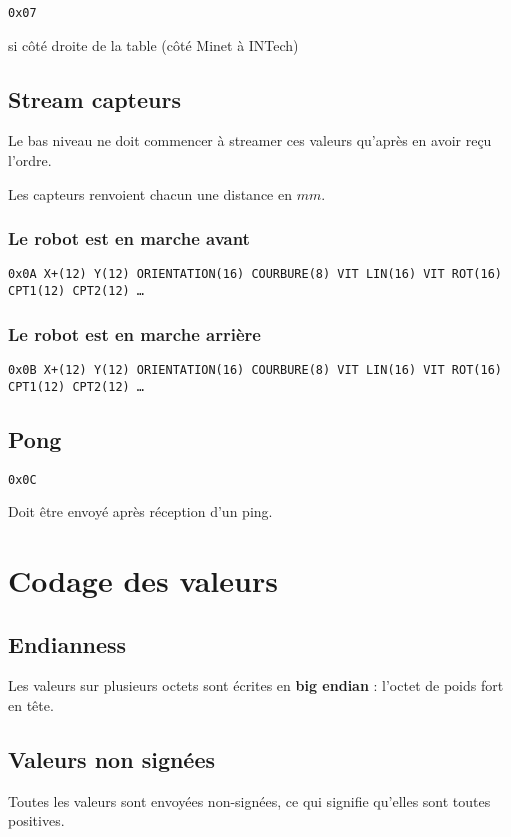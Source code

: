 \documentclass[a4paper, 12pt]{article}
\begin{document}
    \texttt{0x07}
    
    si côté droite de la table (côté Minet à INTech)
    
\subsection{Stream capteurs}

Le bas niveau ne doit commencer à streamer ces valeurs qu'après en avoir reçu l'ordre.

Les capteurs renvoient chacun une distance en $mm$.

\subsubsection{Le robot est en marche avant}
    \texttt{0x0A X+(12) Y(12) ORIENTATION(16) COURBURE(8) VIT  LIN(16) VIT  ROT(16) CPT1(12) CPT2(12) …}
    
\subsubsection{Le robot est en marche arrière}
    \texttt{0x0B X+(12) Y(12) ORIENTATION(16) COURBURE(8) VIT  LIN(16) VIT  ROT(16) CPT1(12) CPT2(12) …}

\subsection{Pong}
     \texttt{0x0C}

Doit être envoyé après réception d'un ping.

\section{Codage des valeurs}

\subsection{Endianness}

Les valeurs sur plusieurs octets sont écrites en \textbf{big endian} : l'octet de poids fort en tête.

\subsection{Valeurs non signées}

Toutes les valeurs sont envoyées non-signées, ce qui signifie qu'elles sont toutes positives.
\end{document}
